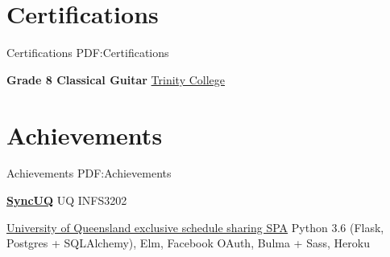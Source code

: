 \documentclass[a4paper,10pt,oneside]{article}
\begin{document}
\begin{body}






\section
{Certifications}
{Certifications}
{PDF:Certifications}





\textbf{Grade 8 Classical Guitar}
\href{http://www.trinitycollege.com/}{Trinity College}
\hfill {}






\section
{Achievements}
{Achievements}
{PDF:Achievements}


\href{https://github.com/MaxwellBo/suq}{\textbf{SyncUQ}} UQ INFS3202 \hfill {}
\begin{detail}
	\BulletItem \href{https://www.syncuq.com/}{University of Queensland exclusive schedule sharing SPA}
	\BulletItem Python 3.6 (Flask, Postgres + SQLAlchemy), Elm, Facebook OAuth, Bulma + Sass, Heroku
\end{detail}
\EntryGap


\end{body}
\end{document}
